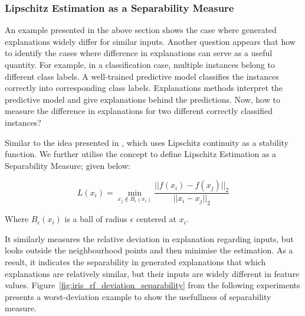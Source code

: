 \documentclass[english]{tktltiki2}
\theoremstyle{definition}
\theoremstyle{remark}
\begin{document}
\subsubsection{Lipschitz Estimation as a Separability Measure}\label{sec:lipschitz_estimation_as_a_separability_measure} %
An example presented in the above section shows the case where generated explanations widely differ for similar inputs. Another question appears that how to identify the cases where difference in explanations can serve as a useful quantity. For example, in a classification case, multiple instances belong to different class labels. A well-trained predictive model classifies the instances correctly into corresponding class labels. Explanations methods interpret the predictive model and give explanations behind the predictions. Now, how to measure the difference in explanations for two different correctly classified instances?

Similar to the idea presented in \citep{alvarez2018robustness}, which uses Lipschitz continuity as a stability function. We further utilise the concept to define Lipschitz Estimation as a Separability Measure; given below:

\begin{equation}\label{eq:lipschitz_estimation_as_a_separability_measure}
L(x_i) = \min_{x_j \notin B_{\epsilon}(x_i)}  \frac{||f(x_i) - f(x_j)||_{2}}{||x_i - x_j||_{2}}
\end{equation}

Where $B_{\epsilon}(x_{i})$ is a ball of radius $\epsilon$ centered at $x_i$.

It similarly measures the relative deviation in explanation regarding inputs, but looks outside the neighbourhood points and then minimise the estimation. As a result, it indicates the separability in generated explanations that which explanations are relatively similar, but their inputs are widely different in feature values. Figure~\ref{fig:iris_rf_deviation_separability} from the following experiments presents a worst-deviation example to show the usefullness of separability measure.
\end{document}
